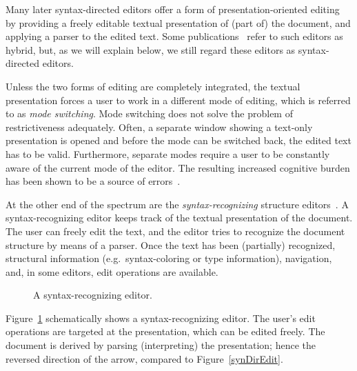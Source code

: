 Many later syntax-directed editors offer a form of presentation-oriented editing by providing a freely editable textual presentation of (part of) the document, and applying a parser to the edited text. Some publications~\cite{teitelbaum81progSynth, minor90editing} refer to such editors as hybrid, but, as we will explain below, we still regard these editors as syntax-directed editors. 

Unless the two forms of editing are completely integrated, the textual presentation forces a user to work in a different mode of editing, which is referred to as {\em mode switching}. Mode switching does not solve the problem of restrictiveness adequately. Often, a separate window showing a text-only presentation is opened and before the mode can be switched back, the edited text has to be valid. Furthermore, separate modes require a user to be constantly aware of the current mode of the editor. The resulting increased cognitive burden has been shown to be a source of errors~\cite{sellen90modes}.


At the other end of the spectrum are the {\em syntax-recognizing} structure editors~\cite{budinsky85sre, ballance92pan}. A syntax-recognizing editor keeps track of the textual presentation of the document. The user can freely edit the text, and the editor tries to recognize the document structure by means of a parser. Once the text has been (partially) recognized, structural information (e.g.\ syntax-coloring or type information), navigation, and, in some editors, edit operations are available.

\begin{figure}
\begin{small}
\begin{center}
\begin{center}
\end{center}\caption{A syntax-recognizing editor.}\label{synRecEdit} 
\end{center}
\end{small}
\end{figure}

Figure~\ref{synRecEdit} schematically shows a syntax-recognizing editor. The user's edit operations are targeted at the presentation, which can be edited freely. The document is derived by parsing (interpreting) the presentation; hence the reversed direction of the arrow, compared to Figure~\ref{synDirEdit}.

